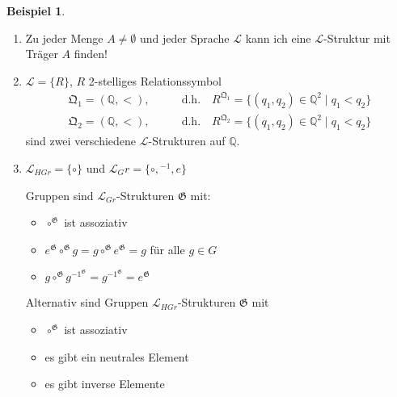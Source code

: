 \documentclass[12pt,parskip=full]{scrartcl}
\newcommand{\setQ}{\mathbb{Q}}
\theoremstyle{definition}
\newtheorem{example}[theorem]{Beispiel}
\begin{document}
	\begin{example}
		\begin{enumerate}[label=\alph*)]
			\item Zu jeder Menge $A \neq \emptyset$ und jeder Sprache $\mathcal{L}$ kann ich eine $\mathcal{L}$-Struktur mit Träger $A$ finden!
			\item $\mathcal{L} = \{ R \}$, $R$ 2-stelliges Relationssymbol
			\begin{align*}
				\mathfrak{Q}_1 = (\setQ, <), &\qquad\text{d.h.}\quad R^{\mathfrak{Q}_1} = \{ (q_1, q_2) \in \setQ^2 \mid q_1 < q_2 \} \\
				\mathfrak{Q}_2 = (\setQ, <), &\qquad\text{d.h.}\quad R^{\mathfrak{Q}_2} = \{ (q_1, q_2) \in \setQ^2 \mid q_1 < q_2 \}
			\end{align*}
			sind zwei verschiedene $\mathcal{L}$-Strukturen auf $\setQ$.
			\item $\mathcal{L}_{HGr} = \{ \circ \}$ und $\mathcal{L}_Gr = \{ \circ, {}^{-1}, e \}$
			
			Gruppen sind $\mathcal{L}_{Gr}$-Strukturen $\mathfrak{G}$ mit:
			\begin{itemize}
				\item $\circ^\mathfrak{G}$ ist assoziativ
				\item $e^\mathfrak{G} \circ^\mathfrak{G} g = g \circ^\mathfrak{G} e^\mathfrak{G} = g$ für alle $g \in G$
				\item $g \circ ^\mathfrak{G} g^{-1^\mathfrak{G}} = g^{-1^\mathfrak{G}} = e^\mathfrak{G}$
			\end{itemize}
		
			Alternativ sind Gruppen $\mathcal{L}_{HGr}$-Strukturen $\mathfrak{G}$ mit
			\begin{itemize}
				\item $\circ^\mathfrak{G}$ ist assoziativ
				\item es gibt ein neutrales Element
				\item es gibt inverse Elemente
			\end{itemize}
		\end{enumerate}
	\end{example}
\end{document}
